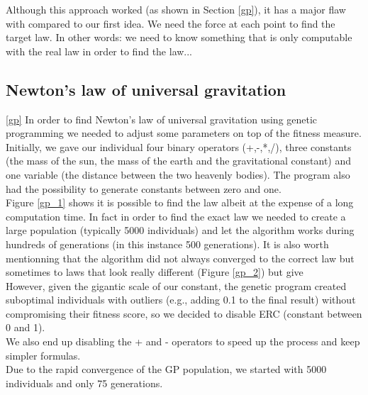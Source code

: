Although this approach worked (as shown in Section \ref{gp}), it
has a major flaw with compared to our first idea. We need the force at each
point to find
the target law. In other words: we need to know something that is only
computable with the
real law in order to find the law...\\

\subsection{Newton's law of universal gravitation}
\ref{gp}
In order to find Newton's law of universal gravitation using genetic
programming we needed to adjust some parameters on top of the fitness
measure.\\

Initially, we gave our individual four binary operators (+,-,*,/), three
constants (the mass of the sun, the mass of the earth and the gravitational
constant) and
one variable (the distance between the two heavenly bodies). The program also
had the possibility to generate constants between zero and one.\\

Figure \ref{gp_1} shows it is possible to find the law albeit at the expense of
a long computation time. In fact in order to find the exact law we needed to
create a large population (typically 5000 individuals) and let the algorithm
works during hundreds of generations (in this instance 500 generations). It is also worth mentionning that the algorithm did not always converged to the correct law but sometimes to laws that look really different (Figure \ref{gp_2}) but give \\

However, given the
gigantic scale of our constant, the genetic program created suboptimal individuals with outliers
(e.g., adding 0.1 to the final result) without compromising their fitness
score, so we decided to disable ERC (constant between 0 and 1).\\
We also end up disabling the + and - operators to speed up the process and keep
simpler formulas.\\

Due to the rapid convergence of the GP population, we started with 5000
individuals and only 75 generations.\\

